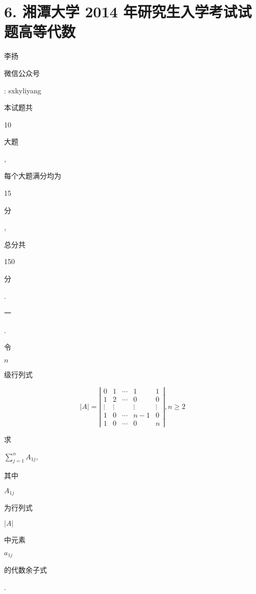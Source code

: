 \documentclass[10pt]{article}
\begin{document}
\section{6. 湘潭大学 2014 年研究生入学考试试题高等代数}
\begin{CJK}{UTF8}{mj}李扬\end{CJK}

\begin{CJK}{UTF8}{mj}微信公众号\end{CJK}: sxkyliyang

\begin{CJK}{UTF8}{mj}本试题共\end{CJK} 10 \begin{CJK}{UTF8}{mj}大题\end{CJK}, \begin{CJK}{UTF8}{mj}每个大题满分均为\end{CJK} 15 \begin{CJK}{UTF8}{mj}分\end{CJK}, \begin{CJK}{UTF8}{mj}总分共\end{CJK} 150 \begin{CJK}{UTF8}{mj}分\end{CJK}.

\begin{CJK}{UTF8}{mj}一\end{CJK}. \begin{CJK}{UTF8}{mj}令\end{CJK} $n$ \begin{CJK}{UTF8}{mj}级行列式\end{CJK}
$$
|A|=\left|\begin{array}{ccccc}
0 & 1 & \cdots & 1 & 1 \\
1 & 2 & \cdots & 0 & 0 \\
\vdots & \vdots & & \vdots & \vdots \\
1 & 0 & \cdots & n-1 & 0 \\
1 & 0 & \cdots & 0 & n
\end{array}\right|, n \geqslant 2
$$
\begin{CJK}{UTF8}{mj}求\end{CJK} $\sum_{j=1}^{n} A_{1 j}$, \begin{CJK}{UTF8}{mj}其中\end{CJK} $A_{1 j}$ \begin{CJK}{UTF8}{mj}为行列式\end{CJK} $|A|$ \begin{CJK}{UTF8}{mj}中元素\end{CJK} $a_{1 j}$ \begin{CJK}{UTF8}{mj}的代数余子式\end{CJK}.
\end{document}
